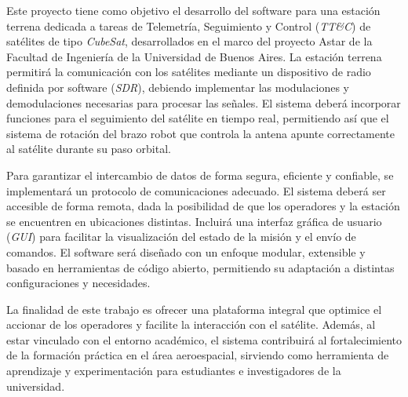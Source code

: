 Este proyecto tiene como objetivo el desarrollo del software para una estación terrena dedicada a tareas de Telemetría, Seguimiento y Control (\textit{TT\&C}) de satélites de tipo \textit{CubeSat}, desarrollados en el marco del proyecto Astar de la Facultad de Ingeniería de la Universidad de Buenos Aires. La estación terrena permitirá la comunicación con los satélites mediante un dispositivo de radio definida por software (\textit{SDR}), debiendo implementar las modulaciones y demodulaciones necesarias para procesar las señales. El sistema deberá incorporar funciones para el seguimiento del satélite en tiempo real, permitiendo así que el sistema de rotación del brazo robot que controla la antena apunte correctamente al satélite durante su paso orbital.

Para garantizar el intercambio de datos de forma segura, eficiente y confiable, se implementará un protocolo de comunicaciones adecuado. El sistema deberá ser accesible de forma remota, dada la posibilidad de que los operadores y la estación se encuentren en ubicaciones distintas. Incluirá una interfaz gráfica de usuario (\textit{GUI}) para facilitar la visualización del estado de la misión y el envío de comandos. El software será diseñado con un enfoque modular, extensible y basado en herramientas de código abierto, permitiendo su adaptación a distintas configuraciones y necesidades.

La finalidad de este trabajo es ofrecer una plataforma integral que optimice el accionar de los operadores y facilite la interacción con el satélite. Además, al estar vinculado con el entorno académico, el sistema contribuirá al fortalecimiento de la formación práctica en el área aeroespacial, sirviendo como herramienta de aprendizaje y experimentación para estudiantes e investigadores de la universidad.
